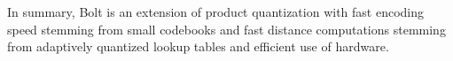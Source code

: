 
In summary, Bolt is an extension of product quantization with fast encoding speed stemming from small codebooks and fast distance computations stemming from adaptively quantized lookup tables and efficient use of hardware.









